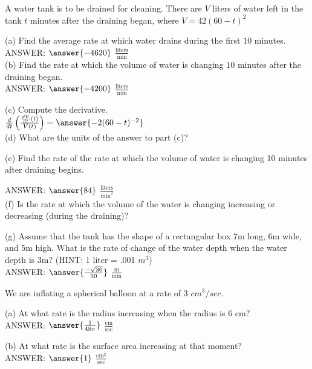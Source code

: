 \documentclass{ximera}
\begin{document}
\begin{exercise}
A water tank is to be drained for cleaning. There are $V$ liters of water left in the tank $t$ minutes after the draining began, where $V=42(60-t)^2$

(a) Find the average rate at which water drains during the first $10$ minutes.\\

ANSWER:  $\answer{-4620}$ $\frac{\text{liters}}{\text{min}}$\\

(b) Find the rate at which the volume of water is changing $10$ minutes after the draining began.\\ 

ANSWER: $\answer{-4200}$ $\frac{\text{liters}}{\text{min}}$

(c) Compute the derivative.\\

 $\frac{d}{dt}\left(\frac{\frac{dV}{dt}(t)}{V(t)}\right)=\answer{-2(60-t)^{-2}}$\\

(d) What are the units of the answer to part (c)?

(e) Find the rate of the rate at which the volume of water is changing 10 minutes after draining begins.

ANSWER: $\answer{84}$ $\frac{\text{liters}}{\text{min}^2}$\\

(f) Is the rate at which the volume of the water is changing increasing or decreasing (during the draining)? 
\begin{multipleChoice}
\end{multipleChoice}

(g) Assume that the tank has the shape of a rectangular box $7$m long, $6$m wide, and $5$m high. What is the rate of change of the water depth when the water depth is $3$m? (HINT: 1 liter = .001 $m^3$) \\

ANSWER: $\answer{\frac{-\sqrt{30}}{50}}$ $\frac{\text{m}}{\text{min}}$

\end{exercise}

\begin{exercise}
We are inflating a spherical balloon at a rate of 3 $cm^3/sec$. 

(a) At what rate is the radius increasing when the radius is $6$ cm?\\

ANSWER:  $\answer{\frac{1}{48\pi}}$ $\frac{\text{cm}}{\text{sec}}$

(b) At what rate is the surface area increasing at that moment?\\

ANSWER:  $\answer{1}$ $\frac{\text{cm}^2}{\text{sec}}$
\end{exercise}
\end{document}

